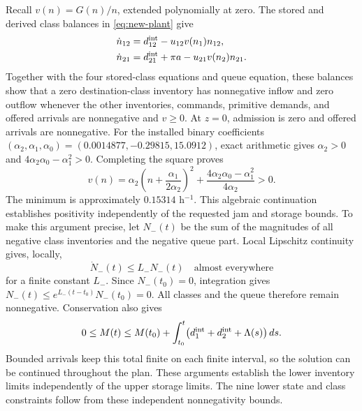 \documentclass[preprint,12pt]{elsarticle}
\begin{document}
Recall $v(n)=G(n)/n$, extended polynomially at zero. The stored and derived
class balances in \eqref{eq:new-plant} give
\begin{equation}
 \begin{aligned}
 \dot n_{12}&=d^{\rm int}_{12}-u_{12}v(n_1)n_{12},\\
 \dot n_{21}&=d^{\rm int}_{21}+\pi a-u_{21}v(n_2)n_{21}.
 \end{aligned}
 \label{eq:structure-derived-classes}
\end{equation}
Together with the four stored-class equations and queue equation, these
balances show that a zero destination-class inventory has nonnegative
inflow and zero outflow whenever the other inventories, commands, primitive
demands, and offered arrivals are nonnegative and $v\ge0$. At $z=0$,
admission is zero and offered arrivals are nonnegative. For the installed
binary coefficients $(\alpha_2,\alpha_1,\alpha_0)=(0.0014877,-0.29815,15.0912)$, exact arithmetic gives
$\alpha_2>0$ and $4\alpha_2\alpha_0-\alpha_1^2>0$. Completing the square proves
\begin{equation}
 v(n)=\alpha_2\left(n+\frac{\alpha_1}{2\alpha_2}\right)^2+
                    \frac{4\alpha_2\alpha_0-\alpha_1^2}{4\alpha_2}>0.
 \label{eq:structure-positive-factor}
\end{equation}
The minimum is approximately $0.15314$ h$^{-1}$. This algebraic continuation
establishes positivity independently of the requested jam and storage bounds.
To make this argument precise, let $N_-(t)$ be the
sum of the magnitudes of all negative class inventories and the negative
queue part. Local Lipschitz continuity gives, locally,
\[
 \dot N_-(t)\le L_-N_-(t)
 \quad\text{almost everywhere}
\]
for a finite constant $L_-$. Since $N_-(t_0)=0$, integration gives
$N_-(t)\le e^{L_-(t-t_0)}N_-(t_0)=0$. All classes and the queue therefore
remain nonnegative. Conservation also gives
\[
 0\le M(t)\le M(t_0)+
 \int_{t_0}^t
 \bigl(d^{\rm int}_1+d^{\rm int}_2+\Lambda(s)\bigr)\,ds.
\]
Bounded arrivals keep this total finite on each finite interval, so the
solution can be continued throughout the plan. These arguments establish
the lower inventory limits independently of the upper storage limits.
The nine lower state and class constraints follow from these independent
nonnegativity bounds.
\end{document}
